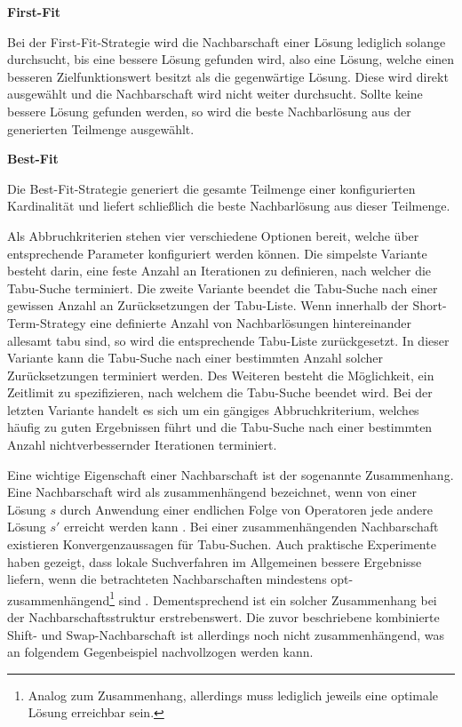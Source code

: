 \textbf{First-Fit}

Bei der First-Fit-Strategie wird die Nachbarschaft einer Lösung lediglich solange durchsucht, bis eine bessere
Lösung gefunden wird, also eine Lösung, welche einen besseren Zielfunktionswert besitzt als die gegenwärtige Lösung.
Diese wird direkt ausgewählt und die Nachbarschaft wird nicht weiter durchsucht. Sollte keine bessere Lösung gefunden werden, so wird die beste Nachbarlösung aus der generierten Teilmenge ausgewählt.

\textbf{Best-Fit}

Die Best-Fit-Strategie generiert die gesamte Teilmenge einer konfigurierten Kardinalität und liefert schließlich die
beste Nachbarlösung aus dieser Teilmenge.\newline

Als Abbruchkriterien stehen vier verschiedene Optionen bereit, welche über entsprechende Parameter konfiguriert werden können. Die simpelste Variante besteht darin, eine feste Anzahl an Iterationen zu definieren, nach welcher die Tabu-Suche terminiert. Die zweite Variante beendet die Tabu-Suche nach einer gewissen Anzahl an Zurücksetzungen der Tabu-Liste. Wenn innerhalb der Short-Term-Strategy eine definierte Anzahl von Nachbarlösungen hintereinander
allesamt tabu sind, so wird die entsprechende Tabu-Liste zurückgesetzt. In dieser Variante kann die Tabu-Suche nach einer bestimmten Anzahl solcher Zurücksetzungen terminiert werden. Des Weiteren besteht die Möglichkeit, ein Zeitlimit
zu spezifizieren, nach welchem die Tabu-Suche beendet wird. Bei der letzten Variante handelt es sich um ein gängiges Abbruchkriterium, welches häufig zu guten Ergebnissen führt und die Tabu-Suche nach einer bestimmten Anzahl nichtverbessernder Iterationen terminiert.

Eine wichtige Eigenschaft einer Nachbarschaft ist der sogenannte Zusammenhang. Eine Nachbarschaft wird als zusammenhängend bezeichnet, wenn von einer Lösung $s$ durch Anwendung einer endlichen Folge von Operatoren jede andere Lösung $s'$ erreicht
werden kann \cite{Brucker2006}. Bei einer zusammenhängenden Nachbarschaft existieren Konvergenzaussagen für Tabu-Suchen.
Auch praktische Experimente haben gezeigt, dass lokale Suchverfahren im Allgemeinen bessere Ergebnisse
liefern, wenn die betrachteten Nachbarschaften mindestens opt-zusammenhängend\footnote{Analog zum Zusammenhang, allerdings muss lediglich jeweils eine optimale Lösung erreichbar sein.} sind \cite{Knust2017}.
Dementsprechend ist ein solcher Zusammenhang bei der Nachbarschaftsstruktur erstrebenswert.
Die zuvor beschriebene kombinierte Shift- und Swap-Nachbarschaft ist allerdings noch nicht zusammenhängend,
was an folgendem Gegenbeispiel nachvollzogen werden kann.

